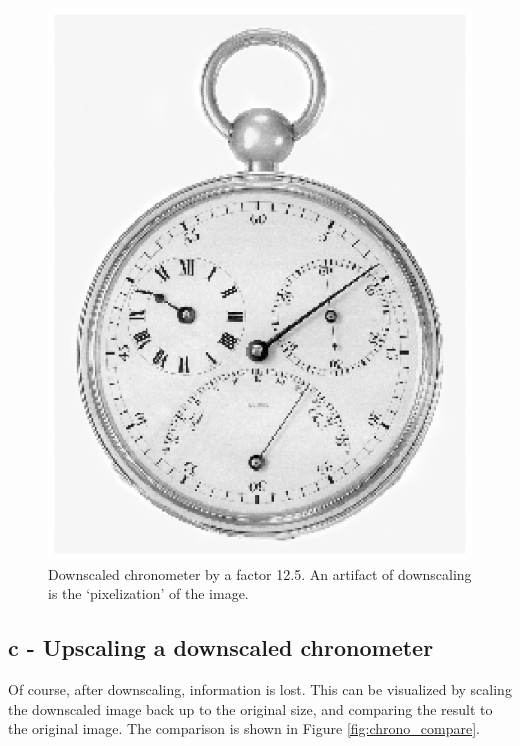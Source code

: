 \begin{figure}[!Htb]
 \centering
 \includegraphics{scaledDownChrono.eps}
 \caption{Downscaled chronometer by a factor 12.5. An artifact of downscaling is the `pixelization' of the image.}
 \label{fig:chrono_down}
\end{figure}

\clearpage

\subsection*{c - Upscaling a downscaled chronometer}
Of course, after downscaling, information is lost. This can be visualized by scaling the downscaled image back up to the original size, and comparing the result to the original image. The comparison is shown in Figure \ref{fig:chrono_compare}.

